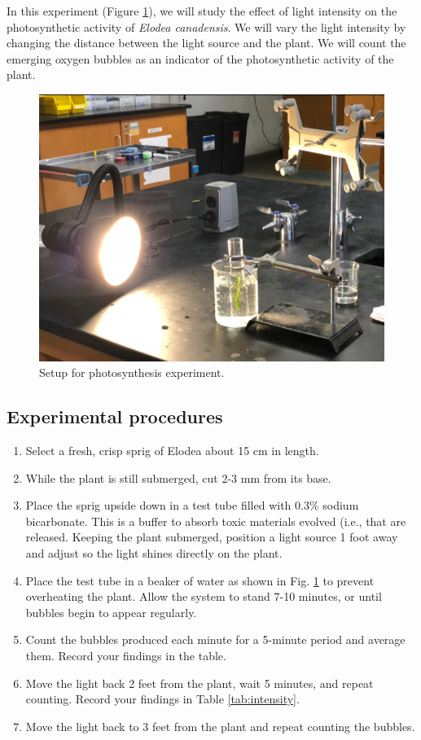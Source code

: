 In this experiment (Figure \ref{fig:photosynthesis}), we will study the
effect of light intensity on the photosynthetic activity of \emph{Elodea
canadensis}. We will vary the light intensity by changing the distance
between the light source and the plant. We will count the emerging
oxygen bubbles as an indicator of the photosynthetic activity of the
plant.

\begin{figure}

{\centering \includegraphics[width=0.7\linewidth]{./figures/photosynthesis/photosynthesis}

}

\caption{Setup for photosynthesis experiment.}\label{fig:photosynthesis}
\end{figure}

\subsection{Experimental procedures}\label{experimental-procedures-21}

\begin{enumerate}
\def\labelenumi{\arabic{enumi}.}
\tightlist
\item
  Select a fresh, crisp sprig of Elodea about 15 cm in length.
\item
  While the plant is still submerged, cut 2-3 mm from its base.
\item
  Place the sprig upside down in a test tube filled with 0.3\% sodium
  bicarbonate. This is a buffer to absorb toxic materials evolved (i.e.,
  that are released. Keeping the plant submerged, position a light
  source 1 foot away and adjust so the light shines directly on the
  plant.
\item
  Place the test tube in a beaker of water as shown in Fig.
  \ref{fig:photosynthesis} to prevent overheating the plant. Allow the
  system to stand 7-10 minutes, or until bubbles begin to appear
  regularly.
\item
  Count the bubbles produced each minute for a 5-minute period and
  average them. Record your findings in the table.
\item
  Move the light back 2 feet from the plant, wait 5 minutes, and repeat
  counting. Record your findings in Table \ref{tab:intensity}.
\item
  Move the light back to 3 feet from the plant and repeat counting the
  bubbles.
\end{enumerate}

